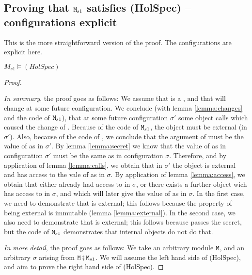 \documentclass[acmsmall,screen,anonymous,review]{acmart}
\begin{document}
\subsection{Proving that ${\mbox{\tt{\ensuremath{{\mbox{\tt{M}}}}}}}_{s1}$ satisfies  (HolSpec) -- configurations explicit}

This is the more straightforward version of the proof. The configurations are explicit here.

\begin{theorem}
\label{theorem:HollSpec}
 $M_{s1} \models (HolSpec) $
\end{theorem}

\begin{proof}
~ ~

\emph{In summary}, the proof goes as follows: We assume that  is a , and that  
will change at some future configuration. 
We conclude (with lemma \ref{lemma:changes} and the code of ${\mbox{\tt{\ensuremath{{\mbox{\tt{M}}}}}}}_{s1}$), that at some future configuration
$\sigma'$ some object  calls   which caused the change of .
 Because of the code of ${\mbox{\tt{\ensuremath{{\mbox{\tt{M}}}}}}}_{s1}$, the object  must be 
external (in $\sigma'$). Also, because of the code of , we conclude that the argument of
 must be the value of  as in $\sigma'$. 
By lemma \ref{lemma:secret} we know that the value of   as in configuration $\sigma'$ must be
the same as in configuration $\sigma$. Therefore, and by application of lemma \ref{lemma:calls}, we obtain that
in $\sigma'$ the object    is external and has access to the vale of  as in $\sigma$.
By application of lemma \ref{lemma:access}, we obtain that either  already had access to 
 in $\sigma$, or there exists a further object  wich has access to  in $\sigma$, and which will later 
give the value of   as in $\sigma$.
In the first case, we need to demonstrate that  is external; this follows because the property of being external is immutable
(lemma \ref{lemma:external}). In the second case, we also need to demonstrate that  is external; this 
follows because  passes the secret, but the code of ${\mbox{\tt{\ensuremath{{\mbox{\tt{M}}}}}}}_{s1}$ demonstrates that internal objects do not do that.


\emph{In more detail}, the proof goes as follows:  We take an arbitrary module ${\mbox{\tt{\ensuremath{{\mbox{\tt{M}}}}}}}$, and an arbitrary  $\sigma$ arising from ${\mbox{\tt{\ensuremath{{\mbox{\tt{M}}}}}}}\fatsemi {\mbox{\tt{\ensuremath{{\mbox{\tt{M}}}}}}}_{s1}$. We
will assume the left hand side of (HolSpec), and aim to prove the right hand side of (HolSpec).
 

\end{proof}
\end{document}
